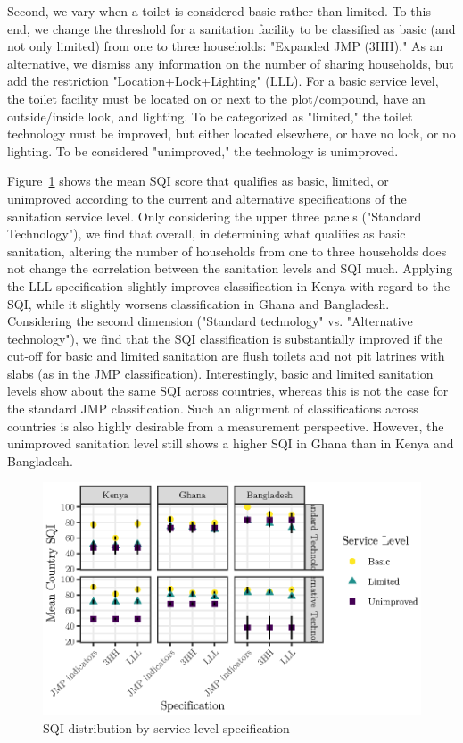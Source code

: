 \documentclass[natbib]{svjour3}                     %
\begin{document}
Second, we vary when a toilet is considered basic rather than limited. To this end, we change the threshold for a sanitation facility to be classified as basic (and not only limited) from one to three households: "Expanded JMP (3HH)." As an alternative, we dismiss any information on the number of sharing households, but add the restriction "Location+Lock+Lighting" (LLL). For a basic service level, the toilet facility must be located on or next to the plot/compound, have an outside/inside look, and lighting. To be categorized as "limited," the toilet technology must be improved, but either located elsewhere, or have no lock, or no lighting. To be considered "unimproved," the technology is unimproved.



Figure~\ref{fig:newlevels} shows the mean SQI score that qualifies as basic, limited, or unimproved according to the current and alternative specifications of the sanitation service level. Only considering the upper three panels ("Standard Technology"), we find that overall, in determining what qualifies as basic sanitation, altering the number of households from one to three households does not change the correlation between the sanitation levels and SQI much. Applying the LLL specification slightly improves classification in Kenya with regard to the SQI, while it slightly worsens classification in Ghana and Bangladesh. Considering the second dimension ("Standard technology" vs. "Alternative technology"), we find that the SQI classification is substantially improved if the cut-off for basic and limited sanitation are flush toilets and not pit latrines with slabs (as in the JMP classification). Interestingly, basic and limited sanitation levels show about the same SQI across countries, whereas this is not the case for the standard JMP classification. Such an alignment of classifications across countries is also highly desirable from a measurement perspective. However, the unimproved sanitation level still shows a higher SQI in Ghana than in Kenya and Bangladesh.

\begin{figure}[ht]
    \centering
    \includegraphics[width=0.99\linewidth]{figures/newlevels.eps}
    \caption{SQI distribution by service level specification}
    \label{fig:newlevels}
\end{figure}
\end{document}
